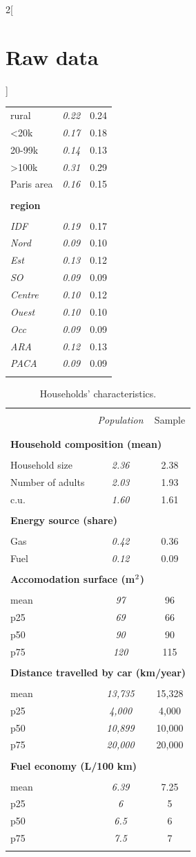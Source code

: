 \documentclass[11pt]{article}
\begin{document}
\begin{appendices}
\begin{multicols}{2}[\section{Raw data\label{sec:Raw-Data}}]
\begin{table}[H]
\begin{tabular}{lcc}
rural & \emph{0.22} & 0.24\tabularnewline
<20k & \emph{0.17} & 0.18\tabularnewline
20-99k & \emph{0.14} & 0.13\tabularnewline
>100k & \emph{0.31} & 0.29\tabularnewline
Paris area & \emph{0.16} & 0.15\tabularnewline
\hline  \\[-1.8ex]
\textbf{region} &  & \tabularnewline  \\[-1.8ex]
\emph{IDF} & \emph{0.19} & 0.17\tabularnewline
 \emph{Nord} & \emph{0.09} & 0.10\tabularnewline
 \emph{Est} & \emph{0.13} & 0.12\tabularnewline
\emph{SO} & \emph{0.09} & 0.09\tabularnewline
\emph{Centre} & \emph{0.10} & 0.12\tabularnewline
 \emph{Ouest} & \emph{0.10} & 0.10\tabularnewline
 \emph{Occ} & \emph{0.09} & 0.09\tabularnewline
\emph{ARA} & \emph{0.12} & 0.13\tabularnewline
\emph{PACA} & \emph{0.09} & 0.09\tabularnewline  \\[-1.8ex]
\hline \hline 
\end{tabular}\bigskip{}
\end{table}


\begin{table}[H]
    \caption{Households' characteristics.\label{tab:app-energetic-characs}}
\centering
\begin{tabular}{lcc}
\hline \hline  \\[-1.8ex]
 & \emph{Population} & Sample  \tabularnewline \\[-1.8ex]
\hline  \\[-1.8ex]
\multicolumn{3}{l}{\textbf{Household composition (mean)}} \tabularnewline  \\[-1.8ex]
Household size & \emph{2.36} & 2.38\tabularnewline
Number of adults & \emph{2.03} & 1.93\tabularnewline
c.u. & \emph{1.60} & 1.61\tabularnewline
\hline   \\[-1.8ex]
\multicolumn{3}{l}{\textbf{Energy source (share)}} \tabularnewline  \\[-1.8ex]
Gas & \emph{0.42} & 0.36\tabularnewline
Fuel & \emph{0.12} & 0.09\tabularnewline
\hline   \\[-1.8ex]
\multicolumn{3}{l}{\textbf{Accomodation surface (m$^\textnormal{2}$)}} \tabularnewline  \\[-1.8ex]
mean & \emph{97} & 96\tabularnewline
p25 & \emph{69} & 66\tabularnewline
p50 & \emph{90} & 90\tabularnewline
p75 & \emph{120} & 115\tabularnewline
\hline   \\[-1.8ex]
\multicolumn{3}{l}{\textbf{Distance travelled by car (km/year)}} \tabularnewline  \\[-1.8ex]
mean & \emph{13,735} & 15,328\tabularnewline
p25 & \emph{4,000} & 4,000\tabularnewline
p50 & \emph{10,899} & 10,000 \tabularnewline
p75 & \emph{20,000 } & 20,000 \tabularnewline
\hline   \\[-1.8ex]
\multicolumn{3}{l}{\textbf{Fuel economy (L/100 km)}} \tabularnewline  \\[-1.8ex]
mean & \emph{6.39} & 7.25\tabularnewline
p25 & \emph{6} & 5\tabularnewline
p50 & \emph{6.5} & 6\tabularnewline
p75 & \emph{7.5} & 7\tabularnewline  \\[-1.8ex]
\hline \hline 
\end{tabular}\bigskip{}


\end{table}
\end{multicols}
\end{appendices}
\end{document}

